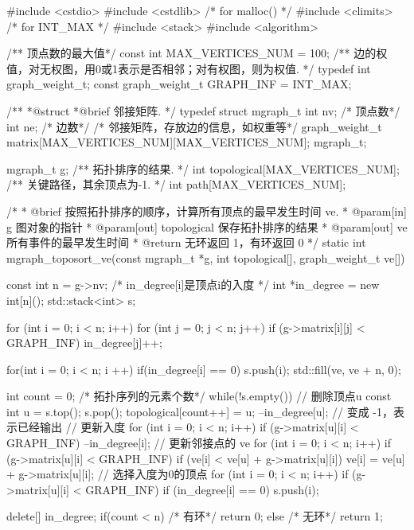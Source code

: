\begin{Codex}[label=mgraph_critical_path.c]
#include <cstdio>
#include <cstdlib>  /* for malloc() */
#include <climits>  /* for INT_MAX */
#include <stack>
#include <algorithm>

/** 顶点数的最大值*/
const int MAX_VERTICES_NUM = 100;
/** 边的权值，对无权图，用0或1表示是否相邻；对有权图，则为权值. */
typedef int graph_weight_t;
const graph_weight_t GRAPH_INF = INT_MAX;

/**
 *@struct
 *@brief 邻接矩阵.
 */
typedef struct mgraph_t {
    int nv; /* 顶点数*/
    int ne; /* 边数*/
    /* 邻接矩阵，存放边的信息，如权重等*/
    graph_weight_t matrix[MAX_VERTICES_NUM][MAX_VERTICES_NUM];
} mgraph_t;

mgraph_t g;
/** 拓扑排序的结果. */
int topological[MAX_VERTICES_NUM];
/** 关键路径，其余顶点为-1. */
int path[MAX_VERTICES_NUM];

/*
  * @brief 按照拓扑排序的顺序，计算所有顶点的最早发生时间 ve.
  * @param[in] g 图对象的指针
  * @param[out] topological 保存拓扑排序的结果
  * @param[out] ve 所有事件的最早发生时间
  * @return 无环返回 1，有环返回 0
  */
static int mgraph_toposort_ve(const mgraph_t *g, int topological[],
        graph_weight_t ve[]) {
    const int n = g->nv;
    /* in_degree[i]是顶点i的入度 */
    int *in_degree = new int[n]();
    std::stack<int> s;

    for (int i = 0; i < n; i++) {
        for (int j = 0; j < n; j++) {
            if (g->matrix[i][j] < GRAPH_INF)
                in_degree[j]++;
        }
    }

    for(int i = 0; i < n; i ++) {
        if(in_degree[i] == 0) {
            s.push(i);
        }
    }
    std::fill(ve, ve + n, 0);

    int count = 0; /* 拓扑序列的元素个数*/
    while(!s.empty()) {
        // 删除顶点u
        const int u = s.top(); s.pop();
        topological[count++] = u;
        --in_degree[u];  // 变成 -1，表示已经输出
        // 更新入度
        for (int i = 0; i < n; i++) if (g->matrix[u][i] < GRAPH_INF) {
            --in_degree[i];
        }
        // 更新邻接点的 ve
        for (int i = 0; i < n; i++) if (g->matrix[u][i] < GRAPH_INF) {
            if (ve[i] < ve[u] + g->matrix[u][i])
                ve[i] = ve[u] + g->matrix[u][i];
        }
        // 选择入度为0的顶点
        for (int i = 0; i < n; i++) if (g->matrix[u][i] < GRAPH_INF) {
            if (in_degree[i] == 0) s.push(i);
        }
    }

    delete[] in_degree;
    if(count < n) { /* 有环*/
        return 0;
    } else { /* 无环*/
        return 1;
    }
}


\end{Codex}
